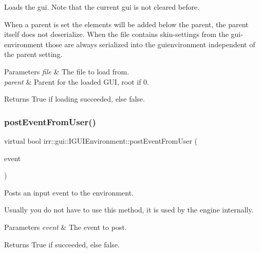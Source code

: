 Loads the gui. Note that the current gui is not cleared before. 

When a parent is set the elements will be added below the parent, the parent itself does not deserialize. When the file contains skin-\/settings from the gui-\/environment those are always serialized into the guienvironment independent of the parent setting. 
\begin{DoxyParams}{Parameters}
{\em file} & The file to load from. \\
\hline
{\em parent} & Parent for the loaded G\+UI, root if 0. \\
\hline
\end{DoxyParams}
\begin{DoxyReturn}{Returns}
True if loading succeeded, else false. 
\end{DoxyReturn}
\mbox{\label{classirr_1_1gui_1_1IGUIEnvironment_aff1cc1109841f9bccd19634870c7cd65}} 
\subsubsection{\texorpdfstring{post\+Event\+From\+User()}{postEventFromUser()}}
{\footnotesize\ttfamily virtual bool irr\+::gui\+::\+I\+G\+U\+I\+Environment\+::post\+Event\+From\+User (\begin{DoxyParamCaption}\item[{const \hyperlink{structirr_1_1SEvent}{S\+Event} \&}]{event }\end{DoxyParamCaption})\hspace{0.3cm}{\ttfamily [pure virtual]}}



Posts an input event to the environment. 

Usually you do not have to use this method, it is used by the engine internally. 
\begin{DoxyParams}{Parameters}
{\em event} & The event to post. \\
\hline
\end{DoxyParams}
\begin{DoxyReturn}{Returns}
True if succeeded, else false. 
\end{DoxyReturn}
\mbox{\label{classirr_1_1gui_1_1IGUIEnvironment_a653ac2cc8640899c23f4d55d9a5f0fdd}} 
